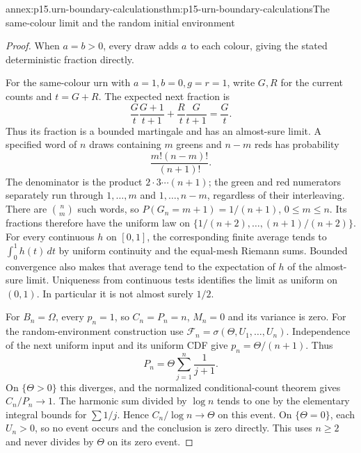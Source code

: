 \begin{annexitem}{annex:p15.urn-boundary-calculations}{thm:p15-urn-boundary-calculations}{The same-colour limit and the random initial environment}
\begin{proof}
When \(a=b>0\), every draw adds \(a\) to each colour,
giving the stated deterministic fraction directly.

For the same-colour urn with \(a=1,b=0,g=r=1\), write \(G,R\)
for the current counts and \(t=G+R\). The expected next fraction is
\[
            \frac Gt\frac{G+1}{t+1}
                   +\frac Rt\frac G{t+1}=\frac Gt.
\]
Thus its fraction is a bounded martingale and has an almost-sure
limit. A specified word of \(n\) draws containing \(m\) greens
and \(n-m\) reds has probability
\[
                              \frac{m!(n-m)!}{(n+1)!}.
\]
The denominator is the product \(2\cdot3\cdots(n+1)\);
the green and red numerators separately run through
\(1,\ldots,m\) and \(1,\ldots,n-m\), regardless of their interleaving.
There are \(\binom nm\) such words, so
\(P(G_n=m+1)=1/(n+1)\), \(0\leq m\leq n\).
Its fractions therefore have the uniform law on
\(\{1/(n+2),\ldots,(n+1)/(n+2)\}\).
For every continuous \(h\) on \([0,1]\), the corresponding
finite average tends to \(\int_0^1h(t)\,dt\) by uniform
continuity and the equal-mesh Riemann sums.
Bounded convergence also makes that average tend to the
expectation of \(h\) of the almost-sure limit.
Uniqueness from continuous tests identifies the limit as
uniform on \((0,1)\). In particular it is not almost surely \(1/2\).

For \(B_n=\Omega\), every \(p_n=1\), so \(C_n=P_n=n\),
\(M_n=0\) and its variance is zero.
For the random-environment construction use
\(\mathcal F_n=\sigma(\Theta,U_1,\ldots,U_n)\).
Independence of the next uniform input and its uniform CDF
give \(p_n=\Theta/(n+1)\). Thus
\[
                            P_n=\Theta\sum_{j=1}^n\frac1{j+1}.
\]
On \(\{\Theta>0\}\) this diverges, and the normalized
conditional-count theorem gives \(C_n/P_n\to1\).
The harmonic sum divided by \(\log n\) tends to one by
the elementary integral bounds for \(\sum 1/j\).
Hence \(C_n/\log n\to\Theta\) on this event.
On \(\{\Theta=0\}\), each \(U_n>0\), so no event occurs
and the conclusion is zero directly. This uses \(n\geq2\)
and never divides by \(\Theta\) on its zero event.
\end{proof}
\end{annexitem}

